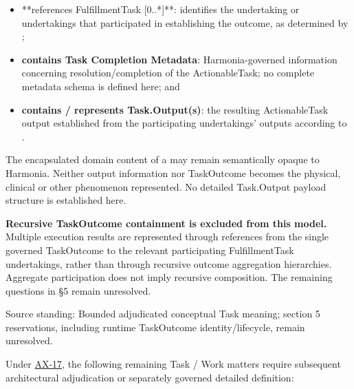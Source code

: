 \begin{itemize}


\item **references FulfillmentTask [0..*]**: identifies the undertaking or
  undertakings that participated in establishing the outcome, as determined
  by \texttt{};

\item \textbf{contains Task Completion Metadata}: Harmonia-governed information
  concerning resolution/completion of the ActionableTask; no complete
  metadata schema is defined here; and

\item \textbf{contains / represents Task.Output(s)}: the resulting ActionableTask
  output established from the participating undertakings' outputs according
  to \texttt{}.

\end{itemize}


The encapsulated domain content of a \texttt{} may remain semantically
opaque to Harmonia. Neither output information nor TaskOutcome becomes the
physical, clinical or other phenomenon represented. No detailed Task.Output
payload structure is established here.



\textbf{Recursive TaskOutcome containment is excluded from this model.} Multiple
execution results are represented through references from the single
governed TaskOutcome to the relevant participating FulfillmentTask
undertakings, rather than through recursive outcome aggregation hierarchies.
Aggregate participation does not imply recursive composition. The remaining
questions in §5 remain unresolved.



Source standing: Bounded adjudicated conceptual Task meaning; section 5 reservations, including runtime TaskOutcome identity/lifecycle, remain unresolved.



Under \hyperref[element:8882573df7ce43c6bc0f66da0a676139]{AX-17}, the following
remaining Task / Work matters require subsequent architectural adjudication
or separately governed detailed definition:



